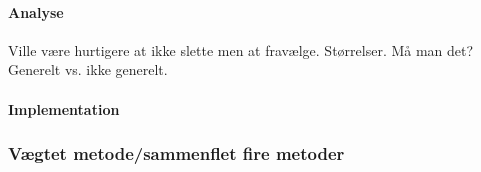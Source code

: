 \paragraph*{Analyse}
Ville være hurtigere at ikke slette men at fravælge. Størrelser. Må man det? Generelt vs. ikke generelt.

\paragraph*{Implementation}


\begin{comment}
\subsubsection{Tobias' brainstorm}
Kan man kigge på højde bredde på components?
Scan linie. Man kan både kigge på components og "signatur" som beskrevet andetsteds(pdf).
Med gradienter kan man finde f.eks. lodrette men ikke vandrette streger. Der er mange lodrette i pladen.
Man kan kigge på en f.eks. 8x8 og se hvor mange komponenter der er tilstede. Der er mange komponenter i et 
lille område i nummerpladen(eller hvad?).

Kør en scanlinie. Noter kraftige gradienter. Hvis de er "tæt" på hinanden er det godt. giv "point"

Det her dropper jeg  indtil videre:
Kør en vertikal scanlinie. Hvis vi møder en gradient begynder vi at "tegne" en streg hvis intensitet 
falder. Den tegner altså en savtak når den møder en gradient. Hvis der er flere høje gradienter i træk får 
vi så en kasse med en skrå afslutning. Er det ikke en nummerplade? 


Nu gør jeg:
Find gradienter i billedet. Lav et binært billede hvor de steder hvor gradienten er større end (0.5 * den 
maximale gradient) er markeret med hvidt.

Der er nu mange markeringer i nummerpladeområdet.

Jeg tænker. Samme princip som med kun at vise maksimale gradienter:
Kig på summen (mængden af hvidt) af alle vandrette linier i billedet. "slet" de linier hvor der er mindre 
end (0.5 * summen af den linie med mest hvidt). Jeg burde nu have fjernet støj men stadig have pladen. Jeg 
statser på at pladen er på de linier med mest hvidt.

\end{comment}

\subsubsection*{Vægtet metode/sammenflet fire metoder}

